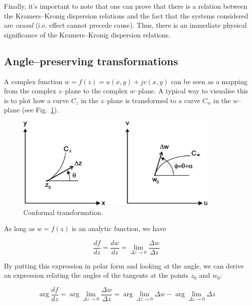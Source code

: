 Finally, it's important to note that one can prove that there is a relation between the Kramers--Kronig dispersion relations and the fact that the systems considered are \emph{causal} (i.e. effect cannot precede cause)\noindent{}. Thus, there is an immediate physical significance of the Kramers--Kronig dispersion relations.


\subsection*{Angle--preserving transformations}

A complex function $w = f(z) = u(x,y)+jv(x,y)$ can be seen as a mapping from the
complex $z$--plane to the complex $w$--plane. A typical way to visualise this is
to plot how a curve $C_z$ in the $z$--plane is transformed to a curve $C_w$ in
the $w$--plane (see Fig.~\ref{fig-conformal}).

\begin{figure}
\centering
\includegraphics[width=10cm]{complex/figures/conformal}
\caption{Conformal transformation.}
\label{fig-conformal}
\end{figure}

As long as $w=f(z)$ is an analytic function, we have

\begin{equation}
\frac{df}{dz} = \frac{dw}{dz} = \lim_{\Delta z \to 0} \frac{\Delta w}{\Delta z}
\end{equation}

By putting this expression in polar form and looking at the angle, we can derive
an expression relating the angles of the tangents at the points $z_0$ and $w_0$:

\begin{equation}
\arg \frac{df}{dz} = \arg \lim_{\Delta z \to 0} \frac{\Delta w}{\Delta z} = \arg
\lim_{\Delta z   \to 0} \Delta w - \arg \lim_{\Delta z \to 0} \Delta z
\end{equation} 


